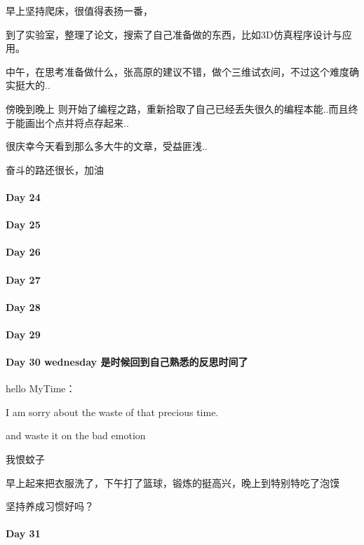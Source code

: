 \documentclass[UTF8,a4paper,8pt]{ctexbook}
\begin{document}
	 	 早上坚持爬床，很值得表扬一番，
	 	 
	 	 到了实验室，整理了论文，搜索了自己准备做的东西，比如3D仿真程序设计与应用。
	 	 
	 	 中午，在思考准备做什么，张高原的建议不错，做个三维试衣间，不过这个难度确实挺大的..
	 	 
	 	 傍晚到晚上 则开始了编程之路，重新拾取了自己已经丢失很久的编程本能..而且终于能画出个点并将点存起来..
	 	 
	 	 很庆幸今天看到那么多大牛的文章，受益匪浅..
	 	 
	 	 奋斗的路还很长，加油
 	 \paragraph{Day 24      \quad     }
 	 \paragraph{Day 25      \quad     }
 	 \paragraph{Day 26      \quad     }
 	 \paragraph{Day 27      \quad     }
 	 \paragraph{Day 28      \quad     }
 	 \paragraph{Day 29      \quad     }   
 	 \paragraph{Day 30   wednesday   \quad   是时候回到自己熟悉的反思时间了  }
	 	 hello MyTime：
	 	 
	 	 I am sorry about the waste of that precious time.
	 	 
	 	 and waste it on the bad emotion
	 	 
	 	 我恨蚊子
	 	 
	 	 早上起来把衣服洗了，下午打了篮球，锻炼的挺高兴，晚上到特别特吃了泡馍
	 	 
	 	 坚持养成习惯好吗？
 	 \paragraph{Day 31      \quad     }
 	  \newpage
\end{document}
